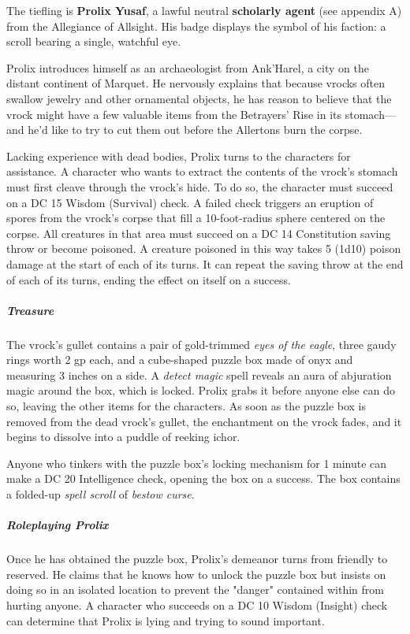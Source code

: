 \documentclass[10pt,a4paper,twoside,fancy,bg=print,twocolumn,openany,nodeprecatedcode]{dndbook}
\begin{document}
The tiefling is \textbf{Prolix Yusaf}, a lawful neutral \textbf{scholarly agent} (see appendix A) from the Allegiance of Allsight. His badge displays the symbol of his faction: a scroll bearing a single, watchful eye.

Prolix introduces himself as an archaeologist from Ank'Harel, a city on the distant continent of Marquet. He nervously explains that because vrocks often swallow jewelry and other ornamental objects, he has reason to believe that the vrock might have a few valuable items from the Betrayers' Rise in its stomach—and he'd like to try to cut them out before the Allertons burn the corpse.

Lacking experience with dead bodies, Prolix turns to the characters for assistance. A character who wants to extract the contents of the vrock's stomach must first cleave through the vrock's hide. To do so, the character must succeed on a DC 15 Wisdom (Survival) check. A failed check triggers an eruption of spores from the vrock's corpse that fill a 10-foot-radius sphere centered on the corpse. All creatures in that area must succeed on a DC 14 Constitution saving throw or become poisoned. A creature poisoned in this way takes 5 (1d10) poison damage at the start of each of its turns. It can repeat the saving throw at the end of each of its turns, ending the effect on itself on a success.

\subparagraph{Treasure}
The vrock's gullet contains a pair of gold-trimmed \textit{eyes of the eagle}, three gaudy rings worth 2 gp each, and a cube-shaped puzzle box made of onyx and measuring 3 inches on a side. A \textit{detect magic} spell reveals an aura of abjuration magic around the box, which is locked. Prolix grabs it before anyone else can do so, leaving the other items for the characters. As soon as the puzzle box is removed from the dead vrock's gullet, the enchantment on the vrock fades, and it begins to dissolve into a puddle of reeking ichor.

Anyone who tinkers with the puzzle box's locking mechanism for 1 minute can make a DC 20 Intelligence check, opening the box on a success. The box contains a folded-up \textit{spell scroll} of \textit{bestow curse}.

\subparagraph{Roleplaying Prolix}
Once he has obtained the puzzle box, Prolix's demeanor turns from friendly to reserved. He claims that he knows how to unlock the puzzle box but insists on doing so in an isolated location to prevent the "danger" contained within from hurting anyone. A character who succeeds on a DC 10 Wisdom (Insight) check can determine that Prolix is lying and trying to sound important.
\end{document}

